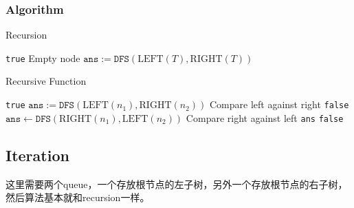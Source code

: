\subsubsection{Algorithm}
\setcounter{algorithm}{0}
\begin{algorithm}[H]
\caption{Recursion}
\begin{algorithmic}[1]
\State \Return \texttt{true} \Comment Empty node
\EndIf
\State $\texttt{ans}:=\texttt{DFS}(\text{LEFT}(T), \text{RIGHT}(T))$
\end{algorithmic}
\end{algorithm}
\begin{algorithm}[H]
\begin{algorithmic}[1]
\EndProcedure
\end{algorithmic}
\end{algorithm}
\begin{algorithm}[H]
\caption{Recursive Function}
\begin{algorithmic}[1]
\State \Return \texttt{true}
\EndIf
{}
\State $\texttt{ans}:= \texttt{DFS}(\text{LEFT}(n_1), \text{RIGHT}(n_2))$ \Comment Compare left against right
\State \Return \texttt{false}
\EndIf
\State $\texttt{ans}\gets \texttt{DFS}(\text{RIGHT}(n_1), \text{LEFT}(n_2))$ \Comment Compare right against left
\State \Return \texttt{ans}
\EndIf
\State \Return \texttt{false}
\EndFunction
\end{algorithmic}
\end{algorithm}
\subsection{Iteration}
\begin{CJK*}{UTF8}{gbsn}
这里需要两个queue，一个存放根节点的左子树，另外一个存放根节点的右子树，然后算法基本就和recursion一样。
\end{CJK*}
